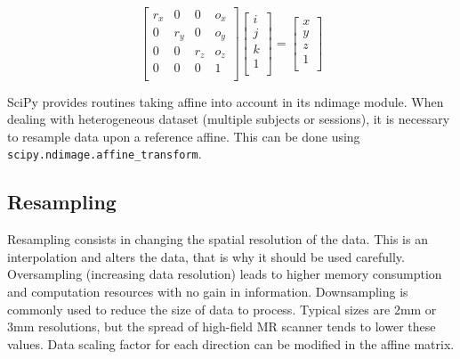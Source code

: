 \documentclass{frontiersSCNS} %
\newcounter{x}
\newcounter{y}
\newcounter{z}
\begin{document}
\[
    \begin{bmatrix}
        r_x & 0   & 0   & o_x \\
        0   & r_y & 0   & o_y \\
        0   & 0   & r_z & o_z \\
        0   & 0   & 0   & 1   \\
    \end{bmatrix}
    \begin{bmatrix}
        i \\
        j \\
        k \\
        1 \\
    \end{bmatrix}
    =
    \begin{bmatrix}
        x \\
        y \\
        z \\
        1 \\
    \end{bmatrix}
\]




SciPy provides routines taking affine into account in its ndimage module.
When dealing with heterogeneous dataset (multiple subjects or sessions), it is
necessary to resample data upon a reference affine. This can be done using
\texttt{scipy.ndimage.affine\_transform}.

\subsection{Resampling}
\label{resampling}

Resampling consists in changing the spatial resolution of the data. This is
an interpolation and alters the data, that is why it should be used carefully.
Oversampling (increasing data resolution) leads to higher memory consumption
and computation resources with no gain in information.
Downsampling is commonly used to reduce the size of data to process.
Typical sizes are 2mm or 3mm resolutions, but the spread of high-field MR
scanner tends to lower these values.
Data scaling factor for each direction can be modified in the affine matrix.
\end{document}
